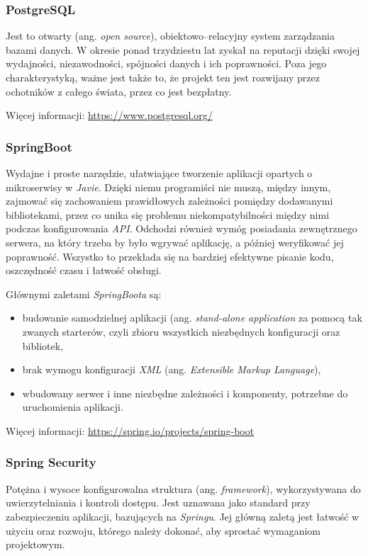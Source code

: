 \documentclass[twoside]{projektInzynierskiMS}
\numberwithin{figure}{section}
\begin{document}
\subsubsection{PostgreSQL}
Jest to otwarty (ang. \textit{open source}), obiektowo–relacyjny system zarządzania bazami danych. W okresie ponad trzydziestu lat zyskał na reputacji dzięki swojej wydajności, niezawodności, spójności danych i ich poprawności. Poza jego charakterystyką, ważne jest także to, że projekt ten jest rozwijany przez ochotników z całego świata, przez co jest bezpłatny.

Więcej informacji: \url{https://www.postgresql.org/}
\subsubsection{SpringBoot}
Wydajne i proste narzędzie, ułatwiające tworzenie aplikacji opartych o mikroserwisy w \textit{Javie}. Dzięki niemu programiści nie muszą, między innym, zajmować się zachowaniem prawidłowych zależności pomiędzy dodawanymi bibliotekami, przez co unika się problemu niekompatybilności między nimi podczas konfigurowania \textit{API}. Odchodzi również wymóg posiadania zewnętrznego serwera, na który trzeba by było wgrywać aplikację, a później weryfikować jej poprawność. Wszystko to przekłada się na bardziej efektywne pisanie kodu, oszczędność czasu i łatwość obsługi.

Głównymi zaletami \textit{SpringBoota} są:
\begin{itemize}
    \item budowanie samodzielnej aplikacji (ang. \textit{stand-alone application} za pomocą tak zwanych starterów, czyli zbioru wszystkich niezbędnych konfiguracji oraz bibliotek,
    \item brak wymogu konfiguracji \textit{XML} (ang. \textit{Extensible Markup Language}),
    \item wbudowany serwer i inne niezbędne zależności i komponenty, potrzebne do uruchomienia aplikacji.
\end{itemize}

Więcej informacji: \url{https://spring.io/projects/spring-boot}
\subsubsection{Spring Security}
Potężna i wysoce konfigurowalna struktura (ang. \textit{framework}), wykorzystywana do uwierzytelniania i kontroli dostępu. Jest uznawana jako standard przy zabezpieczeniu aplikacji, bazujących na \textit{Springu}. Jej główną zaletą jest łatwość w użyciu oraz rozwoju, którego należy dokonać, aby sprostać wymaganiom projektowym.
\end{document}
